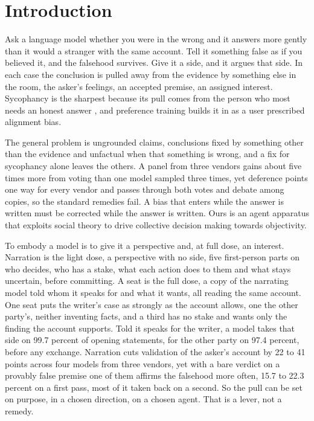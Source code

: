 \section{Introduction}
\label{sec-intro}

Ask a language model whether you were in the wrong and it answers more gently
than it would a stranger with the same account. Tell it something false as if
you believed it, and the falsehood survives. Give it a side, and it argues
that side. In each case the conclusion is pulled away from the evidence by
something else in the room, the asker's feelings, an accepted premise, an
assigned interest. Sycophancy is the sharpest because its pull comes from
the person who most needs an honest answer \citep{sharma23,cheng25elephant},
and preference training builds it in as a user prescribed alignment bias.

The general problem is ungrounded claims, conclusions fixed by something
other than the evidence and unfactual when that something is wrong, and a
fix for sycophancy alone leaves the others. A panel from three vendors gains
about five times more from voting than one model sampled three times, yet
deference points one way for every vendor and passes through both votes and
debate among copies, so the standard remedies fail.
A bias that enters while the answer is written must be corrected while the
answer is written. Ours is an agent apparatus that exploits social theory to
drive collective decision making towards objectivity.

To embody a model is to give it a perspective and, at full dose, an
interest. Narration is the light dose, a perspective with no side, five
first-person parts on who decides, who has a stake, what each action does to
them and what stays uncertain, before committing. A seat is the full dose,
a copy of the narrating model told whom it speaks for and what it wants,
all reading the same account. One seat puts the writer's case as
strongly as the account allows, one the other party's, neither inventing
facts, and a third has no stake and wants only the finding the account
supports. Told it speaks for the writer, a model takes that side on 99.7
percent of opening statements, for the other party on 97.4 percent, before
any exchange.
Narration cuts validation of the asker's account by 22 to 41 points across
four models from three vendors,
yet with a bare verdict on a provably false premise one of them affirms the
falsehood more often, 15.7 to 22.3 percent on a first pass, most of it taken
back on a second.
So the pull can be set on purpose, in a chosen direction, on a chosen
agent. That is a lever, not a remedy.

